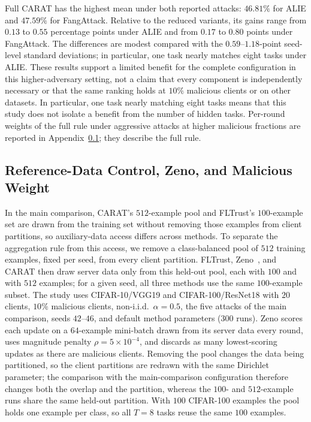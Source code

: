 \FloatBarrier
Full CARAT has the highest mean under both reported attacks: $46.81\%$ for ALIE and $47.59\%$ for FangAttack. Relative to the reduced variants, its gains range from $0.13$ to $0.55$ percentage points under ALIE and from $0.17$ to $0.80$ points under FangAttack. The differences are modest compared with the $0.59$--$1.18$-point seed-level standard deviations; in particular, one task nearly matches eight tasks under ALIE. These results support a limited benefit for the complete configuration in this higher-adversary setting, not a claim that every component is independently necessary or that the same ranking holds at $10\%$ malicious clients or on other datasets. In particular, one task nearly matching eight tasks means that this study does not isolate a benefit from the number of hidden tasks. Per-round weights of the full rule under aggressive attacks at higher malicious fractions are reported in Appendix~\ref{sec:appendix-reference-control}; they describe the full rule.

\FloatBarrier
\subsection{Reference-Data Control, Zeno, and Malicious Weight}
\label{sec:appendix-reference-control}

In the main comparison, CARAT's $512$-example pool and FLTrust's $100$-example set are drawn from the training set without removing those examples from client partitions, so auxiliary-data access differs across methods. To separate the aggregation rule from this access, we remove a class-balanced pool of $512$ training examples, fixed per seed, from every client partition. FLTrust, Zeno~\citep{xie2019zeno}, and CARAT then draw server data only from this held-out pool, each with $100$ and with $512$ examples; for a given seed, all three methods use the same $100$-example subset. The study uses CIFAR-10/VGG19 and CIFAR-100/ResNet18 with $20$ clients, $10\%$ malicious clients, non-i.i.d.\ $\alpha=0.5$, the five attacks of the main comparison, seeds $42$--$46$, and default method parameters ($300$ runs). Zeno scores each update on a $64$-example mini-batch drawn from its server data every round, uses magnitude penalty $\rho=5\times10^{-4}$, and discards as many lowest-scoring updates as there are malicious clients. Removing the pool changes the data being partitioned, so the client partitions are redrawn with the same Dirichlet parameter; the comparison with the main-comparison configuration therefore changes both the overlap and the partition, whereas the $100$- and $512$-example runs share the same held-out partition. With $100$ CIFAR-100 examples the pool holds one example per class, so all $T=8$ tasks reuse the same $100$ examples.

